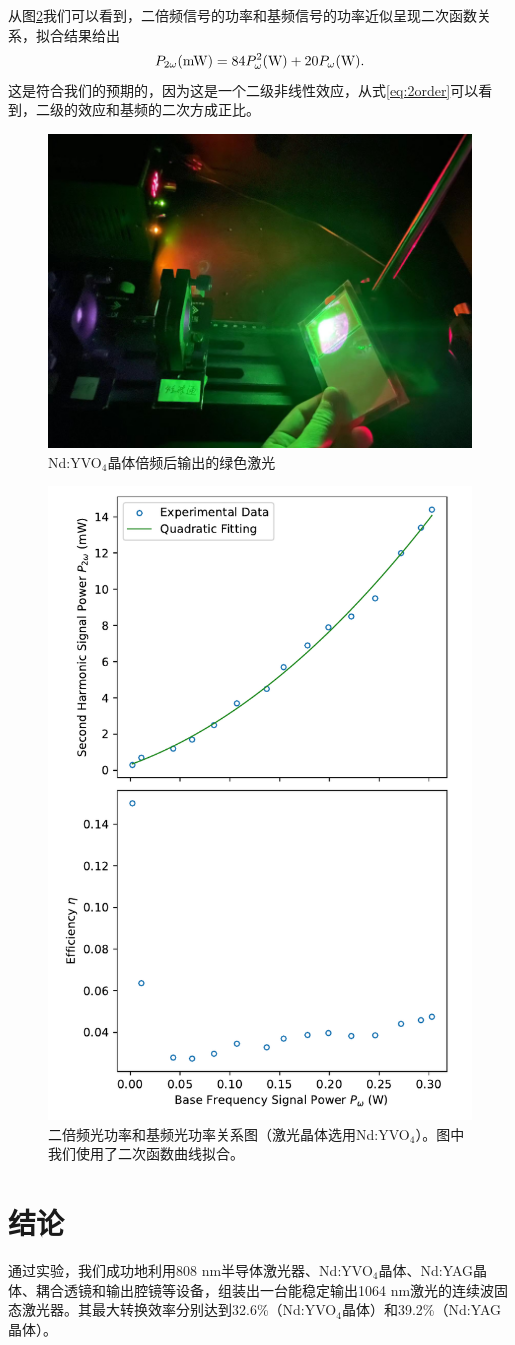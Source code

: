 \documentclass{mpltx}
\begin{document}
从图\ref{fig:P2w_Pw}我们可以看到，二倍频信号的功率和基频信号的功率近似呈现二次函数关系，拟合结果给出
\begin{equation}
  P_{2\omega}({\rm mW})=84P_{\omega}^2({\rm W})+20P_{\omega}({\rm W}).
\end{equation}
这是符合我们的预期的，因为这是一个二级非线性效应，从式\ref{eq:2order}可以看到，二级的效应和基频的二次方成正比。
\begin{figure}[h]
  \centering
  \includegraphics[width=0.5\linewidth]{fig/green.png}
  \caption{Nd:YVO$_4$晶体倍频后输出的绿色激光}
  \label{fig:green}
\end{figure}
\begin{figure}[h]
  \centering
  \includegraphics[width=0.6\linewidth]{fig/P2w_Pw.pdf}
  \caption{二倍频光功率和基频光功率关系图（激光晶体选用Nd:YVO$_4$）。图中我们使用了二次函数曲线拟合。}
  \label{fig:P2w_Pw}
\end{figure}
\section{结论}
通过实验，我们成功地利用808 nm半导体激光器、Nd:YVO$_4$晶体、Nd:YAG晶体、耦合透镜和输出腔镜等设备，组装出一台能稳定输出1064 nm激光的连续波固态激光器。其最大转换效率分别达到32.6\%（Nd:YVO$_4$晶体）和39.2\%（Nd:YAG晶体）。
\end{document}
